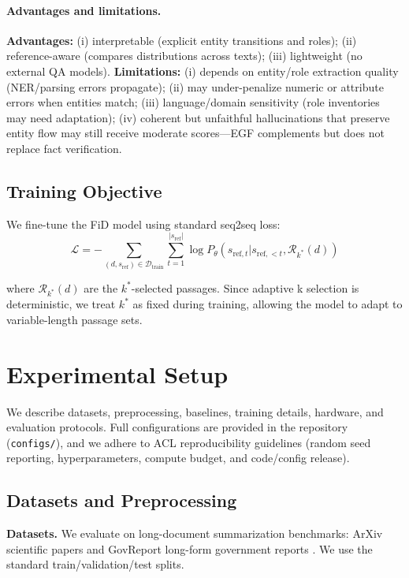 \documentclass[11pt,a4paper]{article}
\begin{document}
\paragraph{Advantages and limitations.}
\textbf{Advantages:} (i) interpretable (explicit entity transitions and roles); (ii) reference-aware (compares distributions across texts); (iii) lightweight (no external QA models). \textbf{Limitations:} (i) depends on entity/role extraction quality (NER/parsing errors propagate); (ii) may under-penalize numeric or attribute errors when entities match; (iii) language/domain sensitivity (role inventories may need adaptation); (iv) coherent but unfaithful hallucinations that preserve entity flow may still receive moderate scores—EGF complements but does not replace fact verification.

\subsection{Training Objective}

We fine-tune the FiD model using standard seq2seq loss:
\begin{equation}
\mathcal{L} = -\sum_{(d,s_{\text{ref}}) \in \mathcal{D}_{\text{train}}} \sum_{t=1}^{|s_{\text{ref}}|} \log P_\theta(s_{\text{ref}, t} | s_{\text{ref}, <t}, \mathcal{R}_{k^*}(d))
\end{equation}

where $\mathcal{R}_{k^*}(d)$ are the $k^*$-selected passages. Since adaptive k selection is deterministic, we treat $k^*$ as fixed during training, allowing the model to adapt to variable-length passage sets.

\section{Experimental Setup}
\label{sec:exp_setup}

We describe datasets, preprocessing, baselines, training details, hardware, and evaluation protocols. Full configurations are provided in the repository (\texttt{configs/}), and we adhere to ACL reproducibility guidelines (random seed reporting, hyperparameters, compute budget, and code/config release).

\subsection{Datasets and Preprocessing}

\textbf{Datasets.} We evaluate on long-document summarization benchmarks: ArXiv scientific papers \cite{cohan2018arxiv} and GovReport long-form government reports \cite{huang2021govreport}. We use the standard train/validation/test splits.
\end{document}

